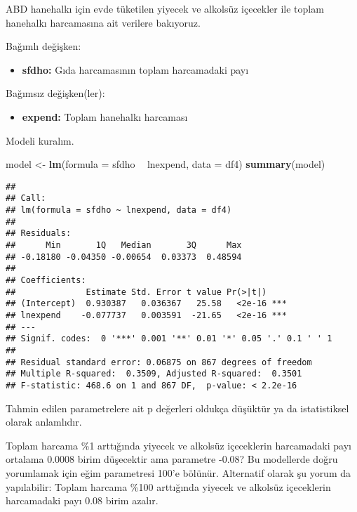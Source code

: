 \documentclass[
]{book}
\newenvironment{Shaded}{\begin{snugshade}}{\end{snugshade}}
\newcommand{\DataTypeTok}[1]{\textcolor[rgb]{0.13,0.29,0.53}{#1}}
\newcommand{\KeywordTok}[1]{\textcolor[rgb]{0.13,0.29,0.53}{\textbf{#1}}}
\newcommand{\NormalTok}[1]{#1}
\newcommand{\OperatorTok}[1]{\textcolor[rgb]{0.81,0.36,0.00}{\textbf{#1}}}
\newcommand{\StringTok}[1]{\textcolor[rgb]{0.31,0.60,0.02}{#1}}
\providecommand{\tightlist}{%
  \setlength{\itemsep}{0pt}\setlength{\parskip}{0pt}}
\begin{document}
ABD hanehalkı için evde tüketilen yiyecek ve alkolsüz içecekler ile toplam hanehalkı harcamasına ait verilere bakıyoruz.

Bağımlı değişken:

\begin{itemize}
\tightlist
\item
  \textbf{sfdho:} Gıda harcamasının toplam harcamadaki payı
\end{itemize}

Bağımsız değişken(ler):

\begin{itemize}
\tightlist
\item
  \textbf{expend:} Toplam hanehalkı harcaması
\end{itemize}

Modeli kuralım.

\begin{Shaded}
\begin{Highlighting}[]
\NormalTok{model <-}\StringTok{ }\KeywordTok{lm}\NormalTok{(}\DataTypeTok{formula =}\NormalTok{ sfdho }\OperatorTok{~}\StringTok{ }\NormalTok{lnexpend, }\DataTypeTok{data =}\NormalTok{ df4)}
\KeywordTok{summary}\NormalTok{(model)}
\end{Highlighting}
\end{Shaded}

\begin{verbatim}
## 
## Call:
## lm(formula = sfdho ~ lnexpend, data = df4)
## 
## Residuals:
##      Min       1Q   Median       3Q      Max 
## -0.18180 -0.04350 -0.00654  0.03373  0.48594 
## 
## Coefficients:
##              Estimate Std. Error t value Pr(>|t|)    
## (Intercept)  0.930387   0.036367   25.58   <2e-16 ***
## lnexpend    -0.077737   0.003591  -21.65   <2e-16 ***
## ---
## Signif. codes:  0 '***' 0.001 '**' 0.01 '*' 0.05 '.' 0.1 ' ' 1
## 
## Residual standard error: 0.06875 on 867 degrees of freedom
## Multiple R-squared:  0.3509, Adjusted R-squared:  0.3501 
## F-statistic: 468.6 on 1 and 867 DF,  p-value: < 2.2e-16
\end{verbatim}

Tahmin edilen parametrelere ait p değerleri oldukça düşüktür ya da istatistiksel olarak anlamlıdır.

Toplam harcama \%1 arttığında yiyecek ve alkolsüz içeceklerin harcamadaki payı ortalama 0.0008 birim düşecektir ama parametre -0.08? Bu modellerde doğru yorumlamak için eğim parametresi 100'e bölünür. Alternatif olarak şu yorum da yapılabilir: Toplam harcama \%100 arttığında yiyecek ve alkolsüz içeceklerin harcamadaki payı 0.08 birim azalır.
\end{document}
